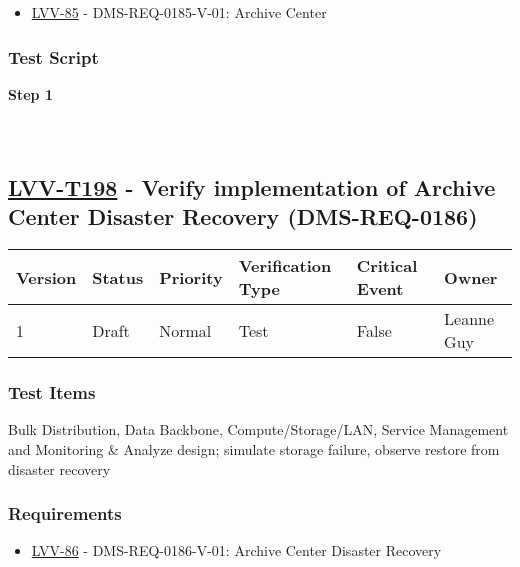 \begin{itemize}
\tightlist
\item
  \href{https://jira.lsstcorp.org/browse/LVV-85}{LVV-85} -
  DMS-REQ-0185-V-01: Archive Center
\end{itemize}

\hypertarget{test-script-174}{%
\subsubsection{Test Script}\label{test-script-174}}

\textbf{Step 1}\\
~\\
~\\

\hypertarget{lvv-t198---verify-implementation-of-archive-center-disaster-recovery-dms-req-0186}{%
\subsection{\texorpdfstring{\href{https://jira.lsstcorp.org/secure/Tests.jspa\#/testCase/LVV-T198}{LVV-T198}
- Verify implementation of Archive Center Disaster Recovery
(DMS-REQ-0186)}{LVV-T198 - Verify implementation of Archive Center Disaster Recovery (DMS-REQ-0186)}}\label{lvv-t198---verify-implementation-of-archive-center-disaster-recovery-dms-req-0186}}

\begin{longtable}[]{@{}llllll@{}}
\toprule
Version & Status & Priority & Verification Type & Critical Event &
Owner\tabularnewline
\midrule
\endhead
1 & Draft & Normal & Test & False & Leanne Guy\tabularnewline
\bottomrule
\end{longtable}

\hypertarget{test-items-174}{%
\subsubsection{Test Items}\label{test-items-174}}

Bulk Distribution, Data Backbone, Compute/Storage/LAN, Service
Management and Monitoring \& Analyze design; simulate storage failure,
observe restore from disaster recovery

\hypertarget{requirements-175}{%
\subsubsection{Requirements}\label{requirements-175}}

\begin{itemize}
\tightlist
\item
  \href{https://jira.lsstcorp.org/browse/LVV-86}{LVV-86} -
  DMS-REQ-0186-V-01: Archive Center Disaster Recovery
\end{itemize}

